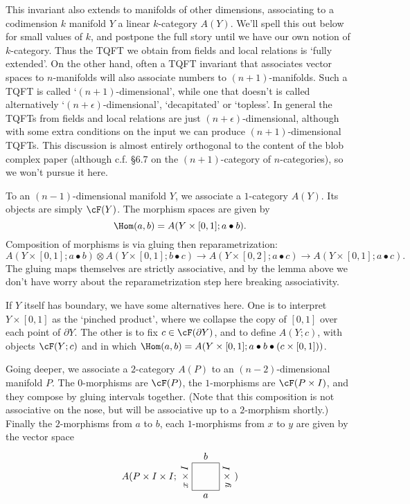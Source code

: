 \documentclass[11pt]{amsart}
\theoremstyle{plain}
\newcommand{\bdy}{\partial}
\newcommand{\tensor}{\otimes}
\begin{document}
This invariant also extends to manifolds of other dimensions, associating to a codimension $k$ manifold $Y$ a linear $k$-category $A(Y)$. We'll spell this out below for small values of $k$, and postpone the full story until we have our own notion of $k$-category. Thus the TQFT we obtain from fields and local relations is `fully extended'. On the other hand, often a TQFT invariant that associates vector spaces to $n$-manifolds will also associate numbers to $(n+1)$-manifolds.  Such a TQFT is called `$(n+1)$-dimensional', while one that doesn't is called alternatively `$(n+\epsilon)$-dimensional', `decapitated' or `topless'. In general the TQFTs from fields and local relations are just $(n+\epsilon)$-dimensional, although with some extra conditions on the input we can produce $(n+1)$-dimensional TQFTs. This discussion is almost entirely orthogonal to the content of the blob complex paper (although c.f. \S 6.7 on the $(n+1)$-category of $n$-categories), so we won't pursue it here.

To an $(n-1)$-dimensional manifold $Y$, we associate a $1$-category $A(Y)$. Its objects are simply $\cF(Y)$. The morphism spaces are given by $$\Hom(a,b) = A(Y \times [0,1]; a \bullet b).$$
Composition of morphisms is via gluing then reparametrization:
$$A(Y \times [0,1]; a \bullet b) \tensor A(Y \times [0,1]; b \bullet c) \to A(Y \times [0,2]; a \bullet c) \to A(Y \times [0,1]; a \bullet c).$$
The gluing maps themselves are strictly associative, and by the lemma above we don't have worry about the reparametrization step here breaking associativity.


If $Y$ itself has boundary, we have some alternatives here. One is to interpret $Y \times [0,1]$ as the `pinched product', where we collapse the copy of $[0,1]$ over each point of $\bdy Y$. The other is to fix $c \in \cF(\bdy Y)$, and to define $A(Y; c)$, with objects $\cF(Y; c)$ and in which $\Hom(a,b) = A(Y \times [0,1]; a \bullet b \bullet (c \times [0,1]))$.

Going deeper, we associate a $2$-category $A(P)$ to an $(n-2)$-dimensional manifold $P$. The $0$-morphisms are $\cF(P)$, the $1$-morphisms are $\cF(P \times I)$, and they compose by gluing intervals together. (Note that this composition is not associative on the nose, but will be associative up to a $2$-morphism shortly.) Finally the $2$-morphisms from $a$ to $b$, each $1$-morphisms from $x$ to $y$ are given by the vector space
$$A(P \times I \times I; \tikz[baseline=11.5]{\draw (0,0) -- node[below] {$a$} (1,0) -- node[below, sloped] {$y \times I$} (1,1) -- node[above] {$b$} (0,1) (0,0) -- node[above,sloped] {$x \times I$} (0,1);})$$ 
\end{document}
